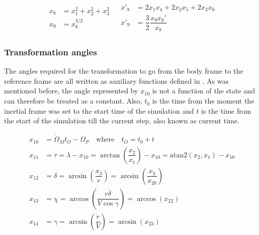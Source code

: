 \begin{align} \label{eq:gravAux}
\begin{split} 
x_{8}&=x_{1}^{2}+x_{2}^{2}+x_{3}^{2}\\
x_{9}&=x_{8}^{3/2}
\end{split} 
&
\begin{split}
x'_{8}&=2x_{1}x_{4}+2x_{2}x_{5}+2x_{3}x_{6}\\
x'_{9}&=\dfrac{3}{2}\dfrac{x_{9}x_{8}'}{x_{8}}
\end{split}
\end{align}
 
 
 \subsubsection{Transformation angles}
 \label{subsubsec:tsiTransAngl}
 The angles required for the transformation to go from the body frame to the reference frame are all written as auxiliary functions defined in . As was mentioned before, the angle represented by $x_{10}$ is not a function of the state and can therefore be treated as a constant. Also, $t_{0}$ is the time from the moment the inertial frame was set to the start time of the simulation and $t$ is the time from the start of the simulation till the current step, also known as current time.
 
 \begin{equation} \label{eq:transAnglAux}
\begin{split}
x_{10} &= \dot{\Omega}_{M}t_{O}-\Omega_{P} \quad \text{where} \quad t_{O}=t_{0}+t \\
x_{11} &= \tau = \lambda - x_{10} = \arctan\left(\dfrac{x_{2}}{x_{1}}\right)-x_{10} = \text{atan2}\left(x_{2},x_{1}\right)-x_{10}\\
x_{12} &= \delta = \arcsin\left(\dfrac{x_{3}}{r}\right) = \arcsin\left(\dfrac{x_{3}}{x_{20}}\right)\\
x_{13} &= \chi = \arccos\left(\dfrac{r \dot{\delta}}{V \cos \gamma}\right)=\arccos\left(x_{22}\right)\\
x_{14} &= \gamma = \arcsin\left(\dfrac{\dot{r}}{V}\right) = \arcsin\left(x_{23}\right)
\end{split}
\end{equation} 

